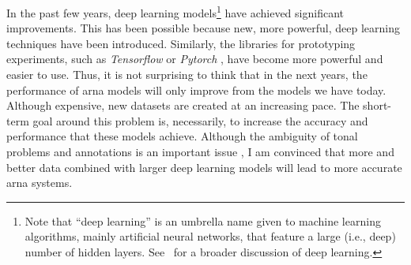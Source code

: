 

In the past few years, deep learning models\footnote{Note
that ``deep learning'' is an umbrella name given to machine
learning algorithms, mainly artificial neural networks, that
feature a large (i.e., deep) number of hidden layers.
See~ for a broader discussion of
deep learning.} have achieved significant improvements. This
has been possible because new, more powerful, deep learning
techniques have been introduced. Similarly, the libraries
for prototyping experiments, such as \emph{Tensorflow}
\parencite{abadi2016tensorflow} or \emph{Pytorch}
\parencite{paszke2019pytorch}, have become more powerful and
easier to use. Thus, it is not surprising to think that in
the next years, the performance of \gls{arna} models will
only improve from the models we have today. Although
expensive, new datasets are created at an increasing pace.
The short-term goal around this problem is, necessarily, to
increase the accuracy and performance that these models
achieve. Although the ambiguity of tonal problems and
annotations is an important issue
\parencite{ju2021addressing}, I am convinced that more and
better data combined with larger deep learning models will
lead to more accurate \gls{arna} systems.

